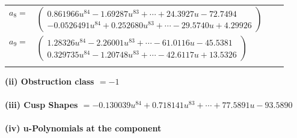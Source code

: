 \documentclass[1p]{elsarticle_modified}
\theoremstyle{definition}
\begin{document}
\begin{tabular}{m{7pt} m{180pt} m{7pt} m{180pt} }
\flushright $a_{8}=$&$\begin{pmatrix}0.861966 u^{84}-1.69287 u^{83}+\cdots+24.3927 u-72.7494\\-0.0526491 u^{84}+0.252680 u^{83}+\cdots-29.5740 u+4.29926\end{pmatrix}$ \\
\flushright $a_{9}=$&$\begin{pmatrix}1.28326 u^{84}-2.26001 u^{83}+\cdots-61.0116 u-45.5381\\0.329735 u^{84}-1.20748 u^{83}+\cdots-42.6117 u+13.5326\end{pmatrix}$\\&\end{tabular}
\flushleft \textbf{(ii) Obstruction class $= -1$}\\~\\
\flushleft \textbf{(iii) Cusp Shapes $= -0.130039 u^{84}+0.718141 u^{83}+\cdots+77.5891 u-93.5890$}\\~\\
\newpage\renewcommand{\arraystretch}{1}
\flushleft \textbf{(iv) u-Polynomials at the component}\newline \\
\end{document}
